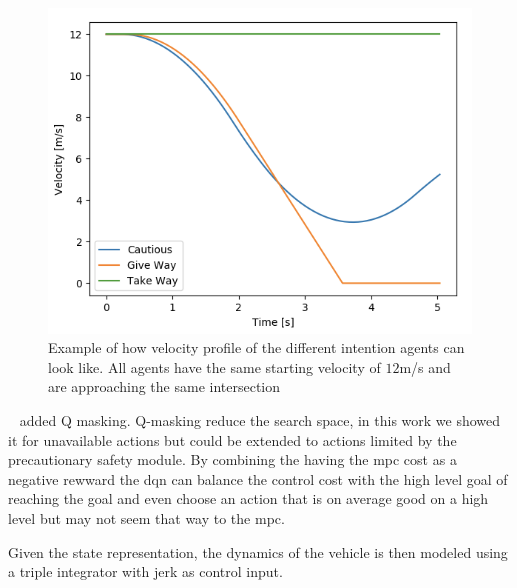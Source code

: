 \begin{figure}[t!]
	\centering
	\includegraphics[width=0.7\columnwidth]{YourThesis/papers/mpc/figures/velocity_profiles_agents.png}
	\caption{Example of how velocity profile of the different intention agents can look like. All agents have the same starting velocity of $12$m/s and are approaching the same intersection}
\end{figure}\
added Q masking.
Q-masking reduce the search space, in this work we showed it for unavailable actions but could be extended to actions limited by the precautionary safety module. 
By combining the having the mpc cost as a negative rewward the \gls{dqn} can balance the control cost with the high level goal of reaching the goal and even choose an action that is on average good on a high level but may not seem that way to the \gls{mpc}.

Given the state representation, the dynamics of the vehicle is then modeled using a  triple integrator with jerk as control input.

